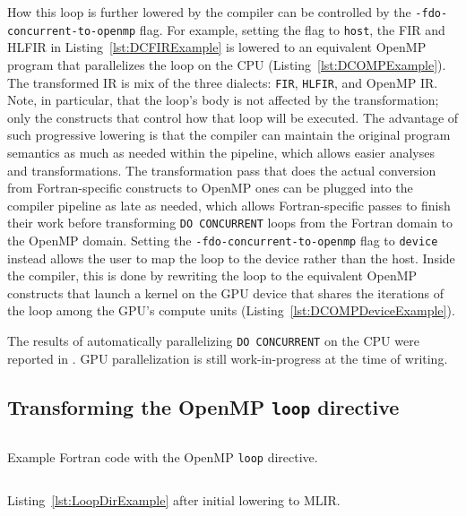 \documentclass[acmtog,natbib=false]{acmart}
\newcommand{\code}[1]{\texttt{#1}\xspace}
\begin{document}
How this loop is further lowered by the compiler can be controlled by the \code{-fdo-concurrent-to-openmp} flag.
For example, setting the flag to \code{host}, the \ac{FIR} and \ac{HLFIR} in Listing~\ref{lst:DCFIRExample} is lowered to an equivalent OpenMP program that parallelizes the loop on the CPU (Listing~\ref{lst:DCOMPExample}).
The transformed IR is mix of the three dialects: \code{FIR}, \code{HLFIR}, and OpenMP \ac{IR}.
Note, in particular, that the loop's body is not affected by the transformation; only the constructs that control how that loop will be executed.
The advantage of such progressive lowering is that the compiler can maintain the original program semantics as much as needed within the pipeline, which allows easier analyses and transformations.
The transformation pass that does the actual conversion from Fortran-specific constructs to OpenMP ones can be plugged into the compiler pipeline as late as needed, which allows Fortran-specific passes to finish their work before transforming \code{DO CONCURRENT} loops from the Fortran domain to the OpenMP domain.
Setting the \code{-fdo-concurrent-to-openmp} flag to \code{device} instead allows the user to map the loop to the device rather than the host.
Inside the compiler, this is done by rewriting the loop to the equivalent OpenMP constructs that launch a kernel on the GPU device that shares the iterations of the loop among the GPU's compute units (Listing~\ref{lst:DCOMPDeviceExample}).

The results of automatically parallelizing \code{DO CONCURRENT} on the CPU were reported in \cite{rouson2025automatically}.
GPU parallelization is still work-in-progress at the time of writing.

\subsection{Transforming the OpenMP \code{loop} directive}

\begin{listing}[t]
\inputminted{Fortran}{code/loop_dir_reduction.f90}
\caption{Example Fortran code with the OpenMP \code{loop} directive.}
\label{lst:LoopDirExample}
\end{listing}

\begin{listing}[t]
\inputminted{MLIR-lexer.py:MlirLexer -x}{code/loop_dir_reduction.mlir}
\caption{Listing~\ref{lst:LoopDirExample} after initial lowering to MLIR.}
\label{lst:LoopDirMLIRExample}
\end{listing}
\end{document}
